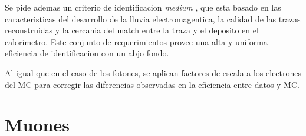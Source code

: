 Se pide ademas un criterio de identificacion \emph{medium} \cite{ATL-PHYS-PUB-2011-006},
que esta basado en las caracteristicas del desarrollo de la lluvia
electromagentica, la calidad de las trazas reconstruidas y la cercania del match
entre la traza y el deposito en el calorimetro. Este conjunto de requerimientos
provee una alta y uniforma eficiencia de identificacion con un abjo fondo.


Al igual que en el caso de los fotones, se aplican factores de escala
a los electrones del MC para corregir las diferencias observadas en la
eficiencia entre datos y MC.

\section{Muones}
\label{sec:muon_obj}

